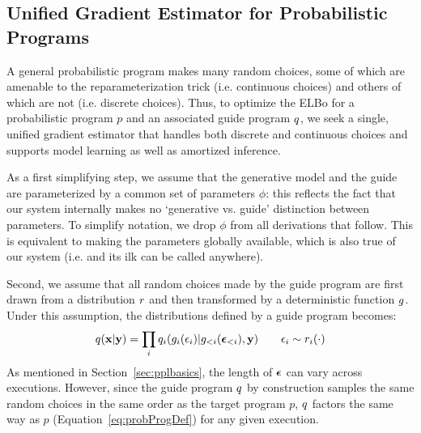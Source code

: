 \subsection{Unified Gradient Estimator for Probabilistic Programs}

A general probabilistic program makes many random choices, some of which are amenable to the reparameterization trick (i.e. continuous choices) and others of which are not (i.e. discrete choices). Thus, to optimize the ELBo for a probabilistic program $p$ and an associated guide program $q$, we seek a single, unified gradient estimator that handles both discrete and continuous choices and supports model learning as well as amortized inference.

As a first simplifying step, we assume that the generative model and the guide are parameterized by a common set of parameters $\phi$: this reflects the fact that our system internally makes no `generative vs. guide' distinction between parameters. To simplify notation, we drop $\phi$ from all derivations that follow. This is equivalent to making the parameters globally available, which is also true of our system (i.e.  and its ilk can be called anywhere).

Second, we assume that all random choices made by the guide program are first drawn from a distribution $r$ and then transformed by a deterministic function $g$. Under this assumption, the distributions defined by a guide program becomes:
\begin{equation*}
q(\mathbf{x} | \mathbf{y}) = \prod_i q_i(g_i(\epsilon_i) | g_{<i}(\bm{\epsilon}_{<i}), \mathbf{y}) \hspace{2em} \epsilon_i \sim r_i(\cdot)
\end{equation*}
As mentioned in Section~\ref{sec:pplbasics}, the length of $\bm{\epsilon}$ can vary across executions. However, since the guide program $q$ by construction samples the same random choices in the same order as the target program $p$, $q$ factors the same way as $p$ (Equation~\ref{eq:probProgDef}) for any given execution. 

